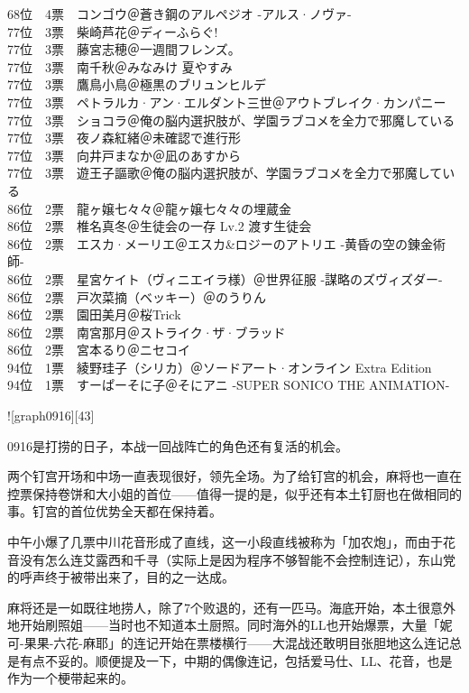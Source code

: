 {    68位　4票　コンゴウ＠蒼き鋼のアルペジオ -アルス·ノヴァ-\\
    77位　3票　柴崎芦花＠ディーふらぐ!\\
    77位　3票　藤宮志穂＠一週間フレンズ。\\
    77位　3票　南千秋＠みなみけ 夏やすみ\\
    77位　3票　鷹鳥小鳥＠極黒のブリュンヒルデ\\
    77位　3票　ペトラルカ·アン·エルダント三世＠アウトブレイク·カンパニー\\
    77位　3票　ショコラ＠俺の脳内選択肢が、学園ラブコメを全力で邪魔している\\
    77位　3票　夜ノ森紅緒＠未確認で進行形\\
    77位　3票　向井戸まなか＠凪のあすから\\
    77位　3票　遊王子謳歌＠俺の脳内選択肢が、学園ラブコメを全力で邪魔している\\
    86位　2票　龍ヶ嬢七々々＠龍ヶ嬢七々々の埋蔵金\\
    86位　2票　椎名真冬＠生徒会の一存 Lv.2 渡す生徒会\\
    86位　2票　エスカ·メーリエ＠エスカ\&ロジーのアトリエ -黄昏の空の錬金術師-\\
    86位　2票　星宮ケイト（ヴィニエイラ様）＠世界征服 -謀略のズヴィズダー-\\
    86位　2票　戸次菜摘（ベッキー）＠のうりん\\
    86位　2票　園田美月＠桜Trick\\
    86位　2票　南宮那月＠ストライク·ザ·ブラッド\\
    86位　2票　宮本るり＠ニセコイ\\
    94位　1票　綾野珪子（シリカ）＠ソードアート·オンライン Extra Edition\\
    94位　1票　すーぱーそに子＠そにアニ -SUPER SONICO THE ANIMATION-
}

![graph0916][43]

0916是打捞的日子，本战一回战阵亡的角色还有复活的机会。

两个钉宫开场和中场一直表现很好，领先全场。为了给钉宫的机会，麻将也一直在控票保持卷饼和大小姐的首位——值得一提的是，似乎还有本土钉厨也在做相同的事。钉宫的首位优势全天都在保持着。

中午小爆了几票中川花音形成了直线，这一小段直线被称为「加农炮」，而由于花音没有怎么连艾露西和千寻（实际上是因为程序不够智能不会控制连记），东山党的呼声终于被带出来了，目的之一达成。

麻将还是一如既往地捞人，除了7个败退的，还有一匹马。海底开始，本土很意外地开始刷照姐——当时也不知道本土厨照。同时海外的LL也开始爆票，大量「妮可-果果-六花-麻耶」的连记开始在票楼横行——大混战还敢明目张胆地这么连记总是有点不妥的。顺便提及一下，中期的偶像连记，包括爱马仕、LL、花音，也是作为一个梗带起来的。

